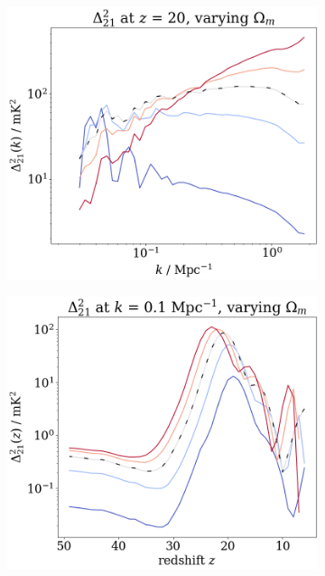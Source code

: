 \documentclass[floats,floatfix,showpacs,amssymb,prd,superscriptaddress,nofootinbib, 11pt]{revtex4-2} %
\begin{document}
\begin{figure}[H]
\begin{subfigure}[b]{0.45\textwidth}
         \includegraphics[width=\textwidth]{images/simulation_results/power_spectrum_fixed_z_20_Om.png}
         \label{fig:power_spectrum_fixed_z_20_Om}
     \end{subfigure}
     \hfill
     \begin{subfigure}[b]{0.45\textwidth}
         \centering
         \includegraphics[width=\textwidth]{images/simulation_results/power_spectrum_fixed_k_0.1_Om.png}
         \label{fig:power_spectrum_fixed_k_0.1_Om}

\end{subfigure}
\end{figure}
\end{document}
